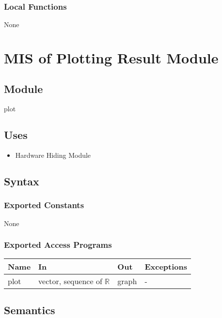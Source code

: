 \documentclass[12pt, titlepage]{article}
\begin{document}
\subsubsection{Local Functions}

None
\newpage
\section{MIS of Plotting Result Module} \label{Plotting_Result_Module} 

\subsection{Module}

plot

\subsection{Uses}

\begin{itemize}
    \item Hardware Hiding Module
\end{itemize}

\subsection{Syntax}

\subsubsection{Exported Constants}

None

\subsubsection{Exported Access Programs}

\begin{center}
\begin{tabular}{p{2cm} p{4cm} p{4cm} p{2cm}}
\hline
\textbf{Name} & \textbf{In} & \textbf{Out} & \textbf{Exceptions} \\
\hline
plot & vector, sequence of $\mathbb{R}$ & graph & -  \\
\hline
\end{tabular}
\end{center}

\subsection{Semantics}
\end{document}
